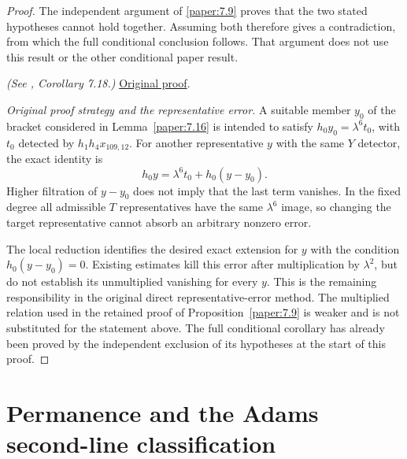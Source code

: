 \begin{proof}
The independent argument of \ref{paper:7.9} proves that the two stated hypotheses cannot hold together. Assuming both therefore gives a contradiction, from which the full conditional conclusion follows. That argument does not use this result or the other conditional paper result.

\textit{(See \cite{LWX126}, Corollary 7.18.)} \href{paper/main.tex.html#L2577}{Original proof}.

\textit{Original proof strategy and the representative error.} A suitable member $y_0$ of the bracket considered in Lemma~\ref{paper:7.16} is intended to satisfy $h_0y_0=\lambda^6t_0$, with $t_0$ detected by $h_1h_4x_{109,12}$. For another representative $y$ with the same $Y$ detector, the exact identity is
\[
 h_0y=\lambda^6t_0+h_0(y-y_0).
\]
Higher filtration of $y-y_0$ does not imply that the last term vanishes. In the fixed degree all admissible $T$ representatives have the same $\lambda^6$ image, so changing the target representative cannot absorb an arbitrary nonzero error.

The local reduction identifies the desired exact extension for $y$ with the condition $h_0(y-y_0)=0$. Existing estimates kill this error after multiplication by $\lambda^2$, but do not establish its unmultiplied vanishing for every $y$. This is the remaining responsibility in the original direct representative-error method. The multiplied relation used in the retained proof of Proposition~\ref{paper:7.9} is weaker and is not substituted for the statement above. The full conditional corollary has already been proved by the independent exclusion of its hypotheses at the start of this proof.
\end{proof}

\section{Permanence and the Adams second-line classification}

